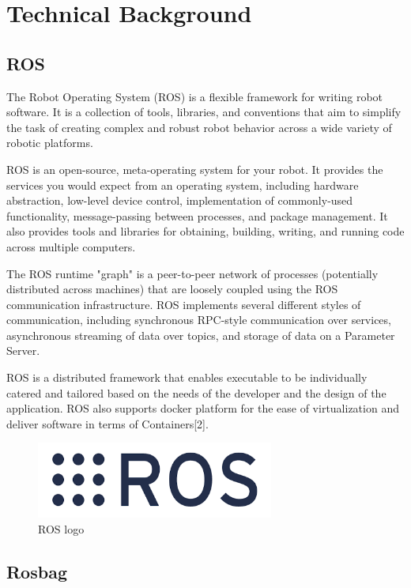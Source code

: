 \chapter{Technical Background}

\section{ROS}

The Robot Operating System (ROS) is a flexible framework for writing robot software. It is a collection of tools, libraries, and conventions that aim to simplify the task of creating complex
and robust robot behavior across a wide variety of robotic platforms. 

ROS is an open-source, meta-operating system for your robot. It provides the services you would expect from an operating system, including hardware abstraction, low-level device control,
implementation of commonly-used functionality, message-passing between processes, and package management. It also provides tools and libraries for obtaining, building, writing, and running code across multiple computers.

The ROS runtime "graph" is a peer-to-peer network of processes (potentially distributed across
machines) that are loosely coupled using the ROS communication infrastructure. 
ROS implements several different styles of communication, including synchronous RPC-style communication over services, asynchronous streaming of data over topics, and storage of data
on a Parameter Server.

ROS is a distributed framework that enables executable to be individually catered and tailored
based on the needs of the developer and the design of the application. ROS also supports docker
platform for the ease of virtualization and deliver software in terms of Containers[2].

\begin{figure}[h]
	\begin{center}
		\includegraphics[height=2.5cm]{images/ros_logo.png}
		\caption{ROS logo}
	\end{center}
\end{figure}


\section{Rosbag}

